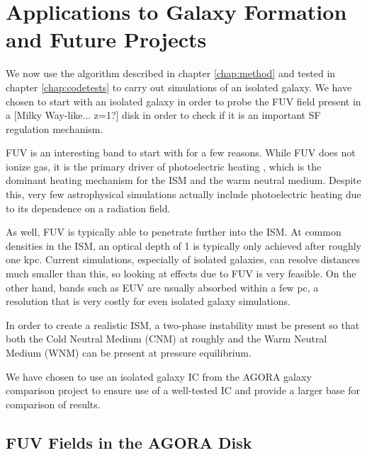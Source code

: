 \pagestyle{fancy}
\headheight 20pt
\chead{}
\lfoot{}
\cfoot{\thepage}
\rfoot{}
\renewcommand{\headrulewidth}{0.1pt}
\renewcommand{\footrulewidth}{0.1pt}

\chapter{Applications to Galaxy Formation and Future Projects}
\label{chap:galaxyformation}
\thispagestyle{fancy}

We now use the algorithm described in chapter \ref{chap:method} and tested in chapter \ref{chap:codetests} to carry out simulations of an isolated galaxy. We have chosen to start with an isolated galaxy in order to probe the FUV field present in a [Milky Way-like... z=1?] disk in order to check if it is an important SF regulation mechanism.

FUV is an interesting band to start with for a few reasons. While FUV does not ionize gas, it is the primary driver of photoelectric heating \citep{tielens05}, which is the dominant heating mechanism for the ISM and the warm neutral medium. Despite this, very few astrophysical simulations actually include photoelectric heating due to its dependence on a radiation field.

As well, FUV is typically able to penetrate further into the ISM. At common densities in the ISM, an optical depth of 1 is typically only achieved after roughly one kpc. Current simulations, especially of isolated galaxies, can resolve distances much smaller than this, so looking at effects due to FUV is very feasible. On the other hand, bands such as EUV are usually absorbed within a few pc, a resolution that is very costly for even isolated galaxy simulations.

In order to create a realistic ISM, a two-phase instability must be present so that both the Cold Neutral Medium (CNM) at roughly  and the Warm Neutral Medium (WNM) can be present at pressure equilibrium.

We have chosen to use an isolated galaxy IC from the AGORA galaxy comparison project \citep{kimEt14} to ensure use of a well-tested IC and provide a larger base for comparison of results.

\section{FUV Fields in the AGORA Disk}
\label{sec:agora}

